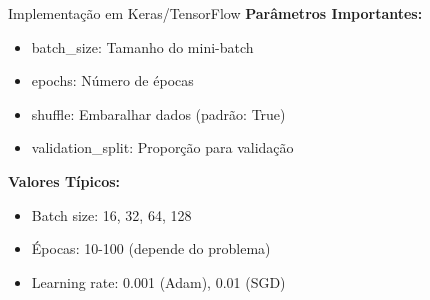 \documentclass[xcolor=dvipsnames,t,aspectratio=169]{beamer}
\newcommand{\highlight}[1]{{\color{nes_dark_orange} #1}}
\begin{document}
\begin{frame}[c]{Implementação em Keras/TensorFlow}
        \textbf{Parâmetros Importantes:}
            \begin{itemize}
                \item \highlight{batch\_size}: Tamanho do mini-batch
                \item \highlight{epochs}: Número de épocas
                \item \highlight{shuffle}: Embaralhar dados (padrão: True)
                \item \highlight{validation\_split}: Proporção para validação
            \end{itemize}
            
            \vspace{0.5cm}
            \textbf{Valores Típicos:}
            \begin{itemize}
                \item Batch size: 16, 32, 64, 128
                \item Épocas: 10-100 (depende do problema)
                \item Learning rate: 0.001 (Adam), 0.01 (SGD)
            \end{itemize}
\end{frame}
\end{document}
